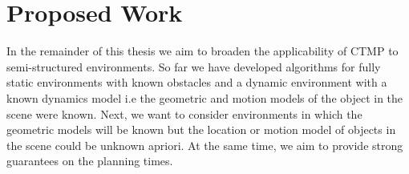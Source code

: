 \documentclass[a4paper,10pt]{article}
\begin{document}

\newpage
\section{Proposed Work}
In the remainder of this thesis we aim to broaden the applicability of CTMP to semi-structured environments. So far we have developed algorithms for fully static environments with known obstacles and a dynamic environment with a known dynamics model i.e the geometric and motion models of the object in the scene were known. Next, we want to consider environments in which the geometric models will be known but the location or motion model of objects in the scene could be unknown apriori. At the same time, we aim to provide strong guarantees on the planning times.
\end{document}
